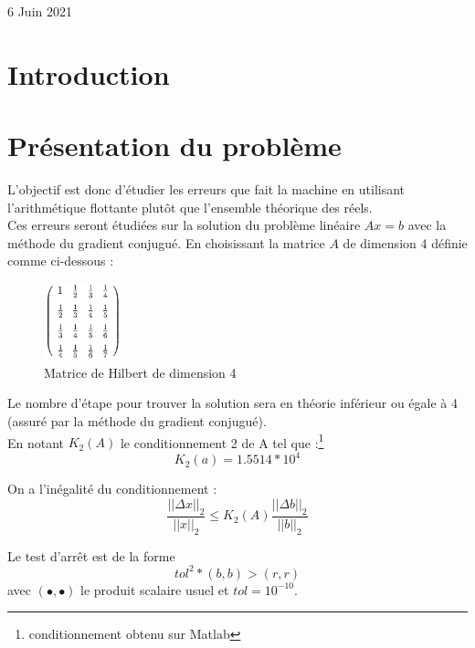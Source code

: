 \documentclass[12,french]{report}
\begin{document}
\begin{titlepage}
\begin{center}
	\vfill
	{\large 6 Juin 2021}
\end{center}
\end{titlepage}

\tableofcontents


\renewcommand{\chaptername}{}
\chapter*{Introduction} %

\chapter{Présentation du problème} %

L'objectif est donc d'étudier les erreurs que fait la machine en utilisant l'arithmétique flottante plutôt que l'ensemble théorique des réels.\\

 Ces erreurs seront étudiées sur la solution du problème linéaire $Ax=b$ avec la méthode du gradient conjugué. En choisissant la matrice $A$ de dimension 4 définie comme ci-dessous :\\

\begin{figure}[H]
	\center
	\includegraphics[width=0.2\textwidth]{./Images/H_4}
	\caption{Matrice de Hilbert de dimension 4}
\end{figure}

Le nombre d'étape pour trouver la solution sera en théorie inférieur ou égale à 4 (assuré par la méthode du gradient conjugué).\\

En notant $K_2(A)$ le conditionnement 2 de A tel que :\footnote{conditionnement obtenu sur Matlab}
$$K_2(a)= 1.5514*10^4$$

On a l'inégalité du conditionnement :
$$\frac{||\Delta x||_{2}}{||x||_2}\leq K_2(A)\frac{||\Delta b||_{2}}{||b||_2}$$

Le test d'arrêt est de la forme $$tol^2*(b,b) > (r,r) $$
avec $(\bullet,\bullet)$ le produit scalaire usuel et $tol=10^{-10}$.\\
\end{document}
